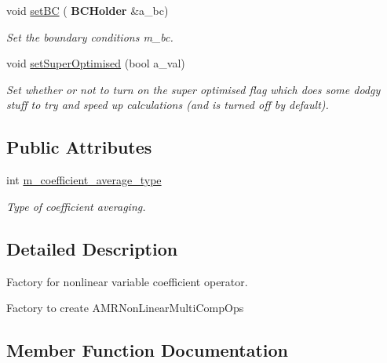\begin{DoxyCompactItemize}
void \hyperlink{class_a_m_r_non_linear_multi_comp_op_factory_acff316ce90ff199f95b6858790d30c31}{set\+BC} (\textbf{ B\+C\+Holder} \&a\+\_\+bc)
\begin{DoxyCompactList}\small\item\em Set the boundary conditions m\+\_\+bc. \end{DoxyCompactList}\item 
\mbox{\label{class_a_m_r_non_linear_multi_comp_op_factory_a6c95e7fb646ac949cf92620473bc0d7f}} 
void \hyperlink{class_a_m_r_non_linear_multi_comp_op_factory_a6c95e7fb646ac949cf92620473bc0d7f}{set\+Super\+Optimised} (bool a\+\_\+val)
\begin{DoxyCompactList}\small\item\em Set whether or not to turn on the \textquotesingle{}super optimised\textquotesingle{} flag which does some dodgy stuff to try and speed up calculations (and is turned off by default). \end{DoxyCompactList}\end{DoxyCompactItemize}
\subsection*{Public Attributes}
\begin{DoxyCompactItemize}
\item 
\mbox{\label{class_a_m_r_non_linear_multi_comp_op_factory_adbaf572b2b096b6a8ff502b943bd4c2f}} 
int \hyperlink{class_a_m_r_non_linear_multi_comp_op_factory_adbaf572b2b096b6a8ff502b943bd4c2f}{m\+\_\+coefficient\+\_\+average\+\_\+type}
\begin{DoxyCompactList}\small\item\em Type of coefficient averaging. \end{DoxyCompactList}\end{DoxyCompactItemize}


\subsection{Detailed Description}
Factory for nonlinear variable coefficient operator. 

Factory to create A\+M\+R\+Non\+Linear\+Multi\+Comp\+Ops 

\subsection{Member Function Documentation}
\mbox{\label{class_a_m_r_non_linear_multi_comp_op_factory_a6a110ce702bf42fe873594f1e2a812a4}} 
